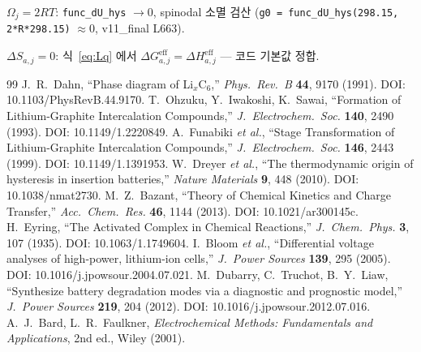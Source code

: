 \documentclass[11pt,a4paper]{article}
\newcommand{\eff}{\mathrm{eff}}
\begin{document}
$\Omega_j=2RT$: \texttt{func\_dU\_hys} $\to0$, spinodal 소멸 검산
(\texttt{g0 = func\_dU\_hys(298.15, 2*R*298.15)} $\approx0$, v11\_final L663).

$\Delta S_{a,j}=0$: 식~\eqref{eq:Lq} 에서 $\Delta G_{a,j}^\eff = \Delta H_{a,j}^\eff$ — 코드 기본값 정합.

\begin{thebibliography}{99}
 J.\ R.\ Dahn, ``Phase diagram of Li$_x$C$_6$,''
  \emph{Phys.\ Rev.\ B} \textbf{44}, 9170 (1991). DOI: 10.1103/PhysRevB.44.9170.
 T.\ Ohzuku, Y.\ Iwakoshi, K.\ Sawai,
  ``Formation of Lithium-Graphite Intercalation Compounds,''
  \emph{J.\ Electrochem.\ Soc.} \textbf{140}, 2490 (1993). DOI: 10.1149/1.2220849.
 A.\ Funabiki \textit{et al.},
  ``Stage Transformation of Lithium-Graphite Intercalation Compounds,''
  \emph{J.\ Electrochem.\ Soc.} \textbf{146}, 2443 (1999). DOI: 10.1149/1.1391953.
 W.\ Dreyer \textit{et al.},
  ``The thermodynamic origin of hysteresis in insertion batteries,''
  \emph{Nature Materials} \textbf{9}, 448 (2010). DOI: 10.1038/nmat2730.
 M.\ Z.\ Bazant,
  ``Theory of Chemical Kinetics and Charge Transfer,''
  \emph{Acc.\ Chem.\ Res.} \textbf{46}, 1144 (2013). DOI: 10.1021/ar300145c.
 H.\ Eyring,
  ``The Activated Complex in Chemical Reactions,''
  \emph{J.\ Chem.\ Phys.} \textbf{3}, 107 (1935). DOI: 10.1063/1.1749604.
 I.\ Bloom \textit{et al.},
  ``Differential voltage analyses of high-power, lithium-ion cells,''
  \emph{J.\ Power Sources} \textbf{139}, 295 (2005). DOI: 10.1016/j.jpowsour.2004.07.021.
 M.\ Dubarry, C.\ Truchot, B.\ Y.\ Liaw,
  ``Synthesize battery degradation modes via a diagnostic and prognostic model,''
  \emph{J.\ Power Sources} \textbf{219}, 204 (2012). DOI: 10.1016/j.jpowsour.2012.07.016.
 A.\ J.\ Bard, L.\ R.\ Faulkner,
  \emph{Electrochemical Methods: Fundamentals and Applications}, 2nd ed., Wiley (2001).
\end{thebibliography}
\end{document}
